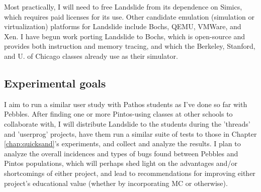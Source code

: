 Most practically, I will need to free Landslide from its dependence on Simics,
which requires paid licenses for its use. %
Other candidate emulation (simulation or virtualization) platforms for Landslide include Bochs, QEMU, VMWare, and Xen.
I have begun work porting Landslide to Bochs, which is open-source and provides both instruction and memory tracing, and
which the Berkeley, Stanford, and U. of Chicago classes already use as their simulator.

\subsection{Experimental goals}


I aim to run a similar user study with Pathos students as I've done so far with Pebbles.
After finding one or more Pintos-using classes at other schools to collaborate with,
I will distribute Landslide to the students during the 'threads' and 'userprog' projects,
have them run a similar suite of tests to those in Chapter \ref{chap:quicksand}'s experiments,
and collect and analyze the results.
I plan to analyze the overall incidences and types of bugs found between Pebbles and Pintos populations,
which will perhaps shed light on the advantages and/or shortcomings of either project,
and lead to recommendations for improving either project's educational value (whether by incorporating MC or otherwise).
